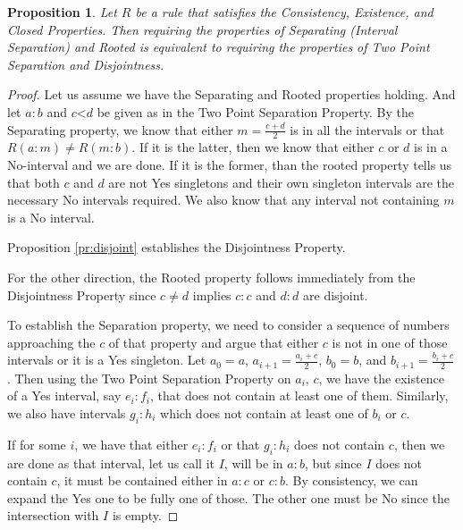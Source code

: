 \documentclass[12pt]{article}
\newtheorem{proposition}{Proposition}[subsection]
\theoremstyle{remark}
\newcommand{\lt}{\mathord{<}}
\begin{document}
\begin{proposition}
    Let $R$ be a rule that satisfies the Consistency, Existence, and Closed Properties. Then requiring the properties of Separating (Interval Separation) and Rooted is equivalent to requiring the properties of Two Point Separation and Disjointness. 
\end{proposition}

\begin{proof}
    Let us assume we have the Separating and Rooted properties holding. And let $a:b$ and $c\lt d$ be given as in the Two Point Separation Property. By the Separating property, we know that either $m =\frac{c+d}{2}$ is in all the intervals or that $R(a:m) \neq R(m:b)$. If it is the latter, then we know that either $c$ or $d$ is in a No-interval and we are done. If it is the former, than the rooted property tells us that both $c$ and $d$ are not Yes singletons and their own singleton intervals are the necessary No intervals required. We also know that any interval not containing $m$ is a No interval. 
    
    Proposition \ref{pr:disjoint} establishes the Disjointness Property. 

    For the other direction, the Rooted property follows immediately from the Disjointness Property since $c \neq d$ implies $c:c$ and $d:d$ are disjoint. 
    
    To establish the Separation property, we need to consider a sequence of numbers approaching the $c$ of that property and argue that either $c$ is not in one of those intervals or it is a Yes singleton. Let $a_0=a$, $a_{i+1} = \frac{a_i + c}{2}$, $b_0 = b$, and $b_{i+1} = \frac{b_i + c}{2}$. Then using the Two Point Separation Property on $a_i$, $c$, we have the existence of a Yes interval, say $e_i:f_i$, that does not contain at least one of them. Similarly, we also have intervals $g_i:h_i$ which does not contain at least one of $b_i$ or $c$. 
    
    If for some $i$,  we have that either $e_i:f_i$ or that $g_i:h_i$ does not contain $c$, then we are done as that interval, let us call it $I$,  will be in $a:b$, but since $I$ does not contain $c$, it must be contained either in $a:c$ or $c:b$. By consistency, we can expand the Yes one to be fully one of those. The other one must be No since the intersection with $I$ is empty. 
    

\end{proof}
\end{document}
